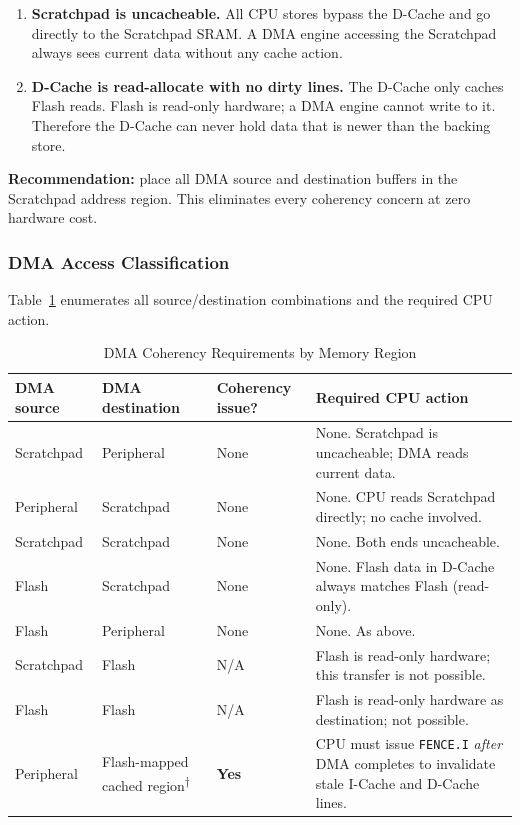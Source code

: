 \begin{enumerate}
  \item \textbf{Scratchpad is uncacheable.}
    All CPU stores bypass the D-Cache and go directly to the Scratchpad
    SRAM.
    A DMA engine accessing the Scratchpad always sees current data without
    any cache action.
  \item \textbf{D-Cache is read-allocate with no dirty lines.}
    The D-Cache only caches Flash reads.
    Flash is read-only hardware; a DMA engine cannot write to it.
    Therefore the D-Cache can never hold data that is newer than the
    backing store.
\end{enumerate}

\textbf{Recommendation:} place all DMA source and destination buffers in
the Scratchpad address region.
This eliminates every coherency concern at zero hardware cost.

\subsubsection{DMA Access Classification}

Table~\ref{tab:asDmaCoh} enumerates all source/destination combinations
and the required CPU action.

\begin{table}[H]
\caption{DMA Coherency Requirements by Memory Region}
\label{tab:asDmaCoh}
\centering
\begin{tabularx}{\textwidth}{|l |X |l |X|}
  \hline
  DMA source & DMA destination & Coherency issue? & Required CPU action \\
  \hline
  \hline
  Scratchpad & Peripheral & None &
    None. Scratchpad is uncacheable; DMA reads current data. \\
  \hline
  Peripheral & Scratchpad & None &
    None. CPU reads Scratchpad directly; no cache involved. \\
  \hline
  Scratchpad & Scratchpad & None &
    None. Both ends uncacheable. \\
  \hline
  Flash      & Scratchpad & None &
    None. Flash data in D-Cache always matches Flash (read-only). \\
  \hline
  Flash      & Peripheral & None &
    None. As above. \\
  \hline
  Scratchpad & Flash      & N/A  &
    Flash is read-only hardware; this transfer is not possible. \\
  \hline
  Flash      & Flash      & N/A  &
    Flash is read-only hardware as destination; not possible. \\
  \hline
  Peripheral & Flash-mapped cached region\textsuperscript{$\dagger$}
             & \textbf{Yes} &
    CPU must issue \texttt{FENCE.I} \emph{after} DMA completes to
    invalidate stale I-Cache and D-Cache lines. \\
  \hline
\end{tabularx}
\end{table}

